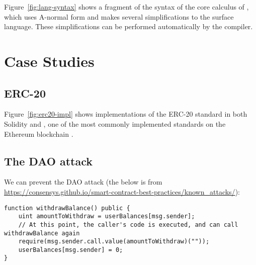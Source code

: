 \documentclass[sigconf]{acmart}
\begin{document}
Figure~\ref{fig:lang-syntax} shows a fragment of the syntax of the core calculus of \langName, which uses A-normal form  and makes several simplifications to the surface \langName language.
These simplifications can be performed automatically by the compiler.

\section{Case Studies}
\subsection{ERC-20}

Figure~\ref{fig:erc20-impl} shows implementations of the ERC-20  standard in both Solidity and \langName, one of the most commonly implemented standards on the Ethereum blockchain .

\begin{figure*}[h]
    \centering
    \begin{minipage}[t]{0.5\textwidth}
        
    \end{minipage}%
    \begin{minipage}[t]{0.5\textwidth}
        
    \end{minipage}
    \caption{A Solidity and a \langName implementation of the core functions of the ERC-20 standard.}
    \label{fig:erc20-impl}
\end{figure*}

\subsection{The DAO attack}
We can prevent the DAO attack (the below is from \url{https://consensys.github.io/smart-contract-best-practices/known_attacks/}):
\begin{lstlisting}
function withdrawBalance() public {
    uint amountToWithdraw = userBalances[msg.sender];
    // At this point, the caller's code is executed, and can call withdrawBalance again
    require(msg.sender.call.value(amountToWithdraw)(""));
    userBalances[msg.sender] = 0;
}
\end{lstlisting}
\end{document}
